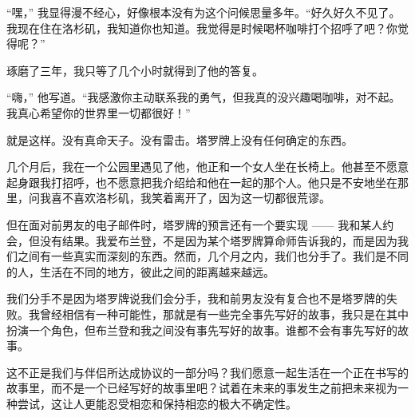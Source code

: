 “嘿，” 我显得漫不经心，好像根本没有为这个问候思量多年。“好久好久不见了。我现在住在洛杉矶，我知道你也知道。我觉得是时候喝杯咖啡打个招呼了吧？你觉得呢？”


琢磨了三年，我只等了几个小时就得到了他的答复。


“嗨，” 他写道。“我感激你主动联系我的勇气，但我真的没兴趣喝咖啡，对不起。我真心希望你的世界里一切都很好！”


就是这样。没有真命天子。没有雷击。塔罗牌上没有任何确定的东西。


几个月后，我在一个公园里遇见了他，他正和一个女人坐在长椅上。他甚至不愿意起身跟我打招呼，也不愿意把我介绍给和他在一起的那个人。他只是不安地坐在那里，问我喜不喜欢洛杉矶，我笑着离开了，因为这一切都很荒谬。


但在面对前男友的电子邮件时，塔罗牌的预言还有一个要实现 —— 我和某人约会，但没有结果。我爱布兰登，不是因为某个塔罗牌算命师告诉我的，而是因为我们之间有一些真实而深刻的东西。然而，几个月之内，我们也分手了。我们是不同的人，生活在不同的地方，彼此之间的距离越来越远。


我们分手不是因为塔罗牌说我们会分手，我和前男友没有复合也不是塔罗牌的失败。我曾经相信有一种可能性，那就是有一些完全事先写好的故事，我只是在其中扮演一个角色，但布兰登和我之间没有事先写好的故事。谁都不会有事先写好的故事。


这不正是我们与伴侣所达成协议的一部分吗？我们愿意一起生活在一个正在书写的故事里，而不是一个已经写好的故事里吧？试着在未来的事发生之前把未来视为一种尝试，这让人更能忍受相恋和保持相恋的极大不确定性。